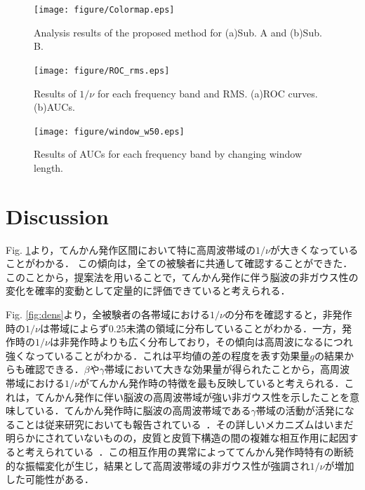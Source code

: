 \documentclass[journal]{IEEEtran}
\begin{document}
\begin{figure}[!t]
\centering
\texttt{[image: figure/Colormap.eps]}
\caption{Analysis results of the proposed method for (a)Sub. A and (b)Sub. B.}
\label{fig:Colormap}
\end{figure}

\begin{figure}[!t]
\centering
\texttt{[image: figure/ROC\_rms.eps]}
\caption{Results of $1/\nu$ for each frequency band and RMS. (a)ROC curves. (b)AUCs. }
\label{fig:roc}
\end{figure}

\begin{figure}[!t]
\centering
\texttt{[image: figure/window\_w50.eps]}
\caption{Results of AUCs for each frequency band by changing window length. }
\label{fig:window}
\end{figure}

\section{Discussion}
Fig. \ref{fig:Colormap}より，てんかん発作区間において特に高周波帯域の$1/\nu$が大きくなっていることがわかる．
この傾向は，全ての被験者に共通して確認することができた．このことから，提案法を用いることで，てんかん発作に伴う脳波の非ガウス性の変化を確率的変動として定量的に評価できていると考えられる．

Fig. \ref{fig:dens}より，全被験者の各帯域における$1/\nu$の分布を確認すると，非発作時の$1/\nu$は帯域によらず0.25未満の領域に分布していることがわかる．一方，発作時の$1/\nu$は非発作時よりも広く分布しており，その傾向は高周波になるにつれ強くなっていることがわかる．これは平均値の差の程度を表す効果量$g$の結果からも確認できる．$\beta$や$\gamma$帯域において大きな効果量が得られたことから，高周波帯域における$1/\nu$がてんかん発作時の特徴を最も反映していると考えられる．これは，てんかん発作に伴い脳波の高周波帯域が強い非ガウス性を示したことを意味している．てんかん発作時に脳波の高周波帯域である$\gamma$帯域の活動が活発になることは従来研究においても報告されている~\cite{Kobayashi2004,Kobayashi2009,Benedek2016}．その詳しいメカニズムはいまだ明らかにされていないものの，皮質と皮質下構造の間の複雑な相互作用に起因すると考えられている~\cite{Kobayashi2004}．この相互作用の異常によっててんかん発作時特有の断続的な振幅変化が生じ，結果として高周波帯域の非ガウス性が強調され$1/\nu$が増加した可能性がある．
\end{document}
